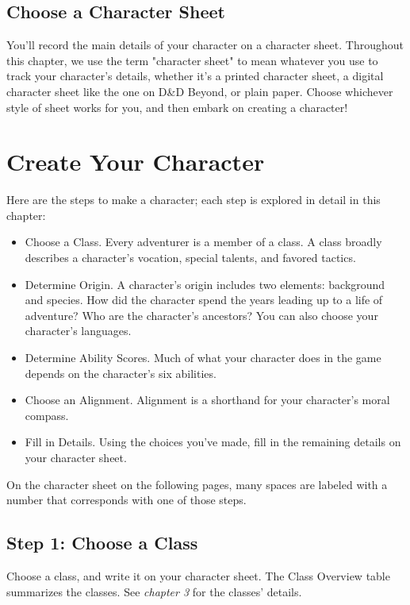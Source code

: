 \documentclass[10pt,a4paper,twoside,bg=print,twocolumn,openany,nodeprecatedcode]{dndbook}
\begin{document}
\subsection{Choose a Character Sheet}
You'll record the main details of your character on a character sheet. Throughout this chapter, we use the term "character sheet" to mean whatever you use to track your character's details, whether it's a printed character sheet, a digital character sheet like the one on D\&D Beyond, or plain paper. Choose whichever style of sheet works for you, and then embark on creating a character!

\section{Create Your Character}
Here are the steps to make a character; each step is explored in detail in this chapter:


\begin{itemize}
\item{Choose a Class.}
Every adventurer is a member of a class. A class broadly describes a character's vocation, special talents, and favored tactics.
\item{Determine Origin.}
A character's origin includes two elements: background and species. How did the character spend the years leading up to a life of adventure? Who are the character's ancestors? You can also choose your character's languages.
\item{Determine Ability Scores.}
Much of what your character does in the game depends on the character's six abilities.
\item{Choose an Alignment.}
Alignment is a shorthand for your character's moral compass.
\item{Fill in Details.}
Using the choices you've made, fill in the remaining details on your character sheet.
\end{itemize}

On the character sheet on the following pages, many spaces are labeled with a number that corresponds with one of those steps.

\subsection{Step 1: Choose a Class}
Choose a class, and write it on your character sheet. The Class Overview table summarizes the classes. See \textit{chapter 3} for the classes' details.
\end{document}
